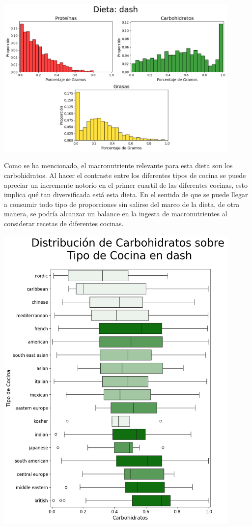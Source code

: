 \documentclass[12pt,a4paper]{article}
\begin{document}
            \begin{center}
                \includegraphics[width=0.90\textwidth]{Resources/2_03_plot_01.png}
            \end{center}

            Como se ha mencionado, el macronutriente relevante para esta dieta son los 
            carbohidratos. Al hacer el contraste entre los diferentes tipos de cocina se 
            puede apreciar un incremente notorio en el primer cuartil de las diferentes 
            cocinas, esto implica qué tan diversificada está esta dieta. En el sentido 
            de que se puede llegar a consumir todo tipo de proporciones sin salirse del 
            marco de la dieta, de otra manera, se podría alcanzar un balance en la ingesta 
            de macronutrientes al considerar recetas de diferentes cocinas.

            \begin{center}
                \includegraphics[width=0.90\textwidth]{Resources/2_03_plot_01_1.png}
            \end{center}
\end{document}
